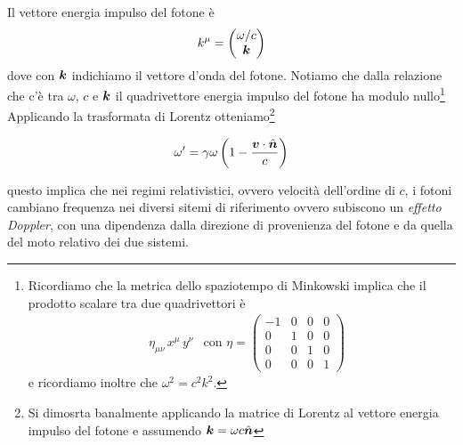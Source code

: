 Il vettore energia impulso del fotone è 
\begin{equation}
k^\mu = \begin{pmatrix}
\omega/c \\
\V{k}
\end{pmatrix}
\end{equation}
dove con $\V{k}$ indichiamo il vettore d'onda del fotone. Notiamo che dalla relazione che c'è tra $\omega$, $c$ e $\V{k}$ il quadrivettore energia impulso del fotone ha modulo nullo\footnote{Ricordiamo che la metrica dello spaziotempo di Minkowski implica che il prodotto scalare tra due quadrivettori è 
\begin{align}
&\eta_{\mu\nu} \,x^\mu\, y^\nu 
&\mathrm{con}\,\,\eta = 
\begin{pmatrix}
-1&0&0&0\\
0&1&0&0\\
0&0&1&0\\
0&0&0&1
\end{pmatrix}
\end{align}
e ricordiamo inoltre che $\omega^2 = c^2k^2$.}
Applicando la trasformata di Lorentz otteniamo\footnote{Si dimosrta banalmente applicando la matrice di Lorentz al vettore energia impulso del fotone e assumendo $\V{k}=\omega c \vers{n}$}
\begin{EQ}
\begin{equation}
\omega' = \gamma \omega \left(1-\dfrac{\V{v}\cdot\vers{n}}{c} \right)
\end{equation}
\end{EQ}
questo implica che nei regimi relativistici, ovvero velocità dell'ordine di $c$, i fotoni cambiano frequenza nei diversi sitemi di riferimento ovvero subiscono un \textit{effetto Doppler}, con una dipendenza dalla direzione di provenienza del fotone e da quella del moto relativo dei due sistemi.

